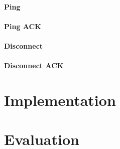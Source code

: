 \documentclass{l4proj}
\begin{document}

\subsubsection{Ping} %
\label{ssub:ping}


\subsubsection{Ping ACK} %
\label{ssub:ping_ack}


\subsubsection{Disconnect} %
\label{ssub:disconnect}


\subsubsection{Disconnect ACK} %
\label{ssub:disconnect_ack}











\chapter{Implementation} %
\label{cha:implementation}





\chapter{Evaluation} %
\label{cha:evaluation}
\end{document}
